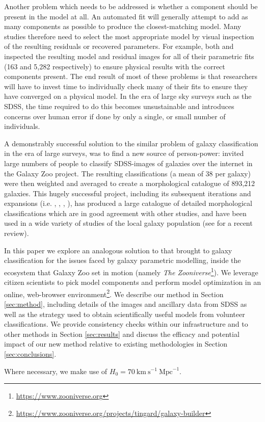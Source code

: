 \documentclass[main\.tex]{subfiles}
\begin{document}
Another problem which needs to be addressed is whether a component should be present in the model at all. An automated fit will generally attempt to add as many components as possible to produce the closest-matching model. Many studies therefore need to select the most appropriate model by visual inspection of the resulting residuals or recovered parameters. For example, both \citet{Vika2014:1408.4070v1} and \citet{2018MNRAS.473.4731K} inspected the resulting model and residual images for all of their parametric fits (163 and 5,282 respectively) to ensure physical results with the correct components present. The end result of most of these problems is that researchers will have to invest time to individually check many of their fits to ensure they have converged on a physical model. In the era of large sky surveys such as the SDSS, the time required to do this becomes unsustainable and introduces concerns over human error if done by only a single, or small number of individuals.

A demonstrably successful solution to the similar problem of galaxy classification in the era of large surveys, was to find a new source of person-power: \cite{Lintott2008:0804.4483v1} invited large numbers of people to classify SDSS-images of galaxies over the internet in the Galaxy Zoo project. The resulting classifications (a mean of 38 per galaxy) were then weighted and averaged to create a morphological catalogue of 893,212 galaxies. This hugely successful project, including its subsequent iterations and expansions (i.e. \citealt{Willett2013:1308.3496v2}, \citealt{Hart2016:1607.01019v1}, \citealt{2017MNRAS.464.4176W}, \citealt{2017MNRAS.464.4420S}), has produced a large catalogue of detailed morphological classifications which are in good agreement with other studies, and have been used in a wide variety of studies of the local galaxy population (see \citealt{2019arXiv191008177M} for a recent review).

In this paper we explore an analogous solution to that \citet{Lintott2008:0804.4483v1} brought to galaxy classification for the issues faced by galaxy parametric modelling, inside the ecosystem that Galaxy Zoo set in motion (namely {\it The Zooniverse}\footnote{\url{https://www.zooniverse.org}}). We leverage citizen scientists to pick model components and perform model optimization in an online, web-browser environment\footnote{\url{https://www.zooniverse.org/projects/tingard/galaxy-builder}}. We describe our method in Section \ref{sec:method}, including details of the images and ancillary data from SDSS as well as the strategy used to obtain scientifically useful models from volunteer classifications. We provide consistency checks within our infrastructure and to other methods in Section \ref{sec:results} and discuss the efficacy and potential impact of our new method relative to existing methodologies in Section \ref{sec:conclusions}.

Where necessary, we make use of $H_0 = 70\ \text{km}\ \text{s}^{-1}\ \text{Mpc}^{-1}$.
\end{document}
